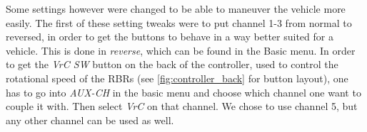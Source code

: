 Some settings however were changed to be able to maneuver the vehicle
more easily. The first of these setting tweaks were to put channel 1-3 from
normal to reversed, in order to get the buttons to behave in a way better
suited for a vehicle. This is done in \textit{reverse}, which can be found in the
Basic menu. In order to get the \textit{VrC SW} button on the back of the
controller, used to control the rotational speed of the RBRs (see
\cref{fig:controller_back} for button layout), one has to go into
\textit{AUX-CH} in the basic menu and choose which channel  one want to couple
it with. Then select \textit{VrC} on that channel. We chose to use channel 5,
but any other channel can be used as well.

